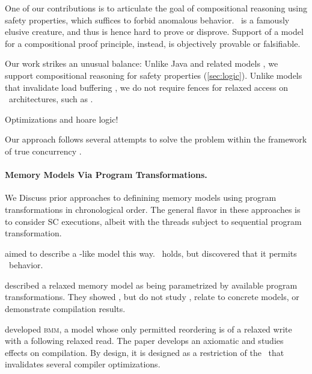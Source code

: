 One of our contributions is to articulate the goal of compositional reasoning
using safety properties, which suffices to forbid anomalous behavior.  \oota\
is a famously elusive creature, and thus is hence hard to prove or disprove.
Support of a model for a compositional proof principle, instead, is
objectively provable or falsifiable.

Our work strikes an unusual balance: Unlike Java and related models
\cite{Manson:2005:JMM:1047659.1040336,DBLP:conf/esop/JagadeesanPR10,DBLP:conf/popl/KangHLVD17},
we support compositional reasoning for safety properties
(\textsection\ref{sec:logic}).  Unlike models that invalidate load buffering
\cite{Dolan:2018:BDR:3192366.3192421,BoehmOOTA,DBLP:conf/pldi/LahavVKHD17},
we do not require fences for relaxed access on \mca\ architectures, such as
\armeight.

Optimizations and hoare logic!

Our approach follows several attempts to solve the problem within the
framework of true concurrency
\cite{DBLP:conf/lics/JeffreyR16,Pichon-Pharabod:2016:CSR:2837614.2837616,DBLP:conf/esop/CenciarelliKS07}.





\paragraph{Memory Models Via Program Transformations.}
We Discuss prior approaches to definining memory models using program
transformations in chronological order.  The general flavor in these
approaches is to consider SC executions, albeit with the threads subject to
sequential program transformation.

\citet{Saraswat:2007:TMM:1229428.1229469}
aimed to describe a \jmm-like model this way.  \drfsc\ holds, but \citet{SP} 
discovered that it permits \oota\ behavior.

\citet{DBLP:conf/esop/FerreiraFS10} described a relaxed memory model as being
parametrized by available program transformations.  They showed \drfsc, but do not
study \oota, relate to concrete models, or demonstrate compilation results.

\citet{DBLP:conf/popl/DemangeLZJPV13} developed \textsc{bmm}, a model whose only
permitted reordering is of a relaxed write with a following relaxed read.
The paper develops an axiomatic and studies effects on compilation.  By
design, it is designed as a restriction of the \jmm\ that invalidates several
compiler optimizations.

